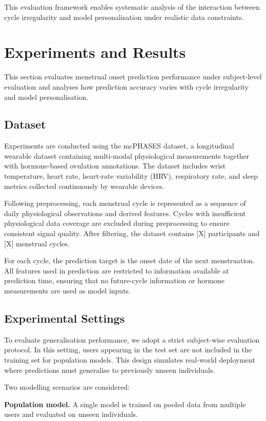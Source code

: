 \documentclass[conference]{IEEEtran}
\begin{document}
This evaluation framework enables systematic analysis of the interaction between cycle irregularity and model personalisation under realistic data constraints.
\section{Experiments and Results}

This section evaluates menstrual onset prediction performance under subject-level evaluation and analyses how prediction accuracy varies with cycle irregularity and model personalisation.

\subsection{Dataset}

Experiments are conducted using the mcPHASES dataset, a longitudinal wearable dataset containing multi-modal physiological measurements together with hormone-based ovulation annotations. The dataset includes wrist temperature, heart rate, heart-rate variability (HRV), respiratory rate, and sleep metrics collected continuously by wearable devices.

Following preprocessing, each menstrual cycle is represented as a sequence of daily physiological observations and derived features. Cycles with insufficient physiological data coverage are excluded during preprocessing to ensure consistent signal quality. After filtering, the dataset contains [X] participants and [X] menstrual cycles.

For each cycle, the prediction target is the onset date of the next menstruation. All features used in prediction are restricted to information available at prediction time, ensuring that no future-cycle information or hormone measurements are used as model inputs.

\subsection{Experimental Settings}

To evaluate generalisation performance, we adopt a strict subject-wise evaluation protocol. In this setting, users appearing in the test set are not included in the training set for population models. This design simulates real-world deployment where predictions must generalise to previously unseen individuals.

Two modelling scenarios are considered:

\textbf{Population model.}  
A single model is trained on pooled data from multiple users and evaluated on unseen individuals.
\end{document}
